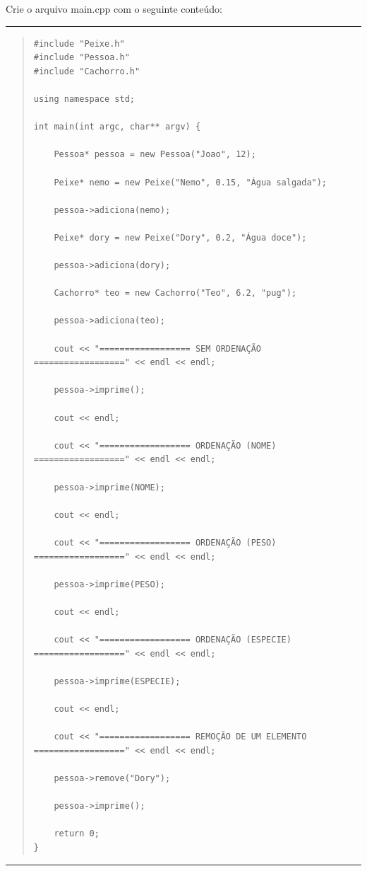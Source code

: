 \documentclass[12pt]{article}
\begin{document}
Crie o arquivo {\sf main.cpp} com o seguinte conteúdo:

\par\noindent\rule{\textwidth}{0.4pt}

\begin{quote}
\begin{scriptsize}
\begin{verbatim}
#include "Peixe.h"
#include "Pessoa.h"
#include "Cachorro.h"

using namespace std;

int main(int argc, char** argv) {
    
    Pessoa* pessoa = new Pessoa("Joao", 12);
    
    Peixe* nemo = new Peixe("Nemo", 0.15, "Água salgada");
    
    pessoa->adiciona(nemo);
    
    Peixe* dory = new Peixe("Dory", 0.2, "Água doce");
    
    pessoa->adiciona(dory);
    
    Cachorro* teo = new Cachorro("Teo", 6.2, "pug");
    
    pessoa->adiciona(teo);
    
    cout << "================== SEM ORDENAÇÃO ==================" << endl << endl;
    
    pessoa->imprime();
    
    cout << endl;
    
    cout << "================== ORDENAÇÃO (NOME) ==================" << endl << endl;
    
    pessoa->imprime(NOME);
    
    cout << endl;
    
    cout << "================== ORDENAÇÃO (PESO) ==================" << endl << endl;
    
    pessoa->imprime(PESO);
    
    cout << endl;
    
    cout << "================== ORDENAÇÃO (ESPECIE) ==================" << endl << endl;
    
    pessoa->imprime(ESPECIE);
    
    cout << endl;
    
    cout << "================== REMOÇÃO DE UM ELEMENTO ==================" << endl << endl;
        
    pessoa->remove("Dory");
    
    pessoa->imprime();
    
    return 0;
}
\end{verbatim}
\end{scriptsize}
\end{quote}

\par\noindent\rule{\textwidth}{0.4pt}
\end{document}
